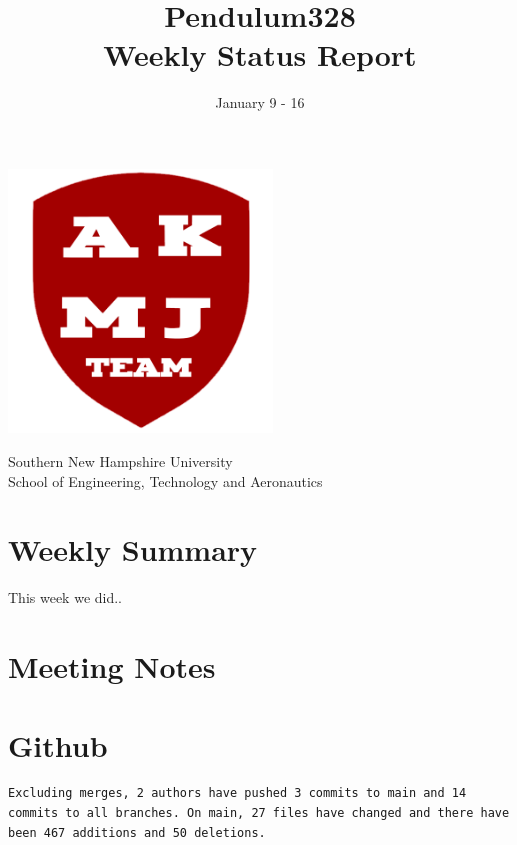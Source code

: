 \documentclass{article}
\title{Pendulum328\\[1ex] \large Weekly Status Report}
\date{January 9 - 16}
\begin{document}
\maketitle

\begin{center}
    \includegraphics[height=7cm]{../../Media/AJMK_Logo.png}

    \vspace{0.8cm}

    Southern New Hampshire University\\
    School of Engineering, Technology and Aeronautics
\end{center}

\pagebreak


\section{Weekly Summary}

This week we did..

\section{Meeting Notes}


\section{Github}

\begin{lstlisting}[breaklines=true]
Excluding merges, 2 authors have pushed 3 commits to main and 14 commits to all branches. On main, 27 files have changed and there have been 467 additions and 50 deletions.
\end{lstlisting}
\end{document}
